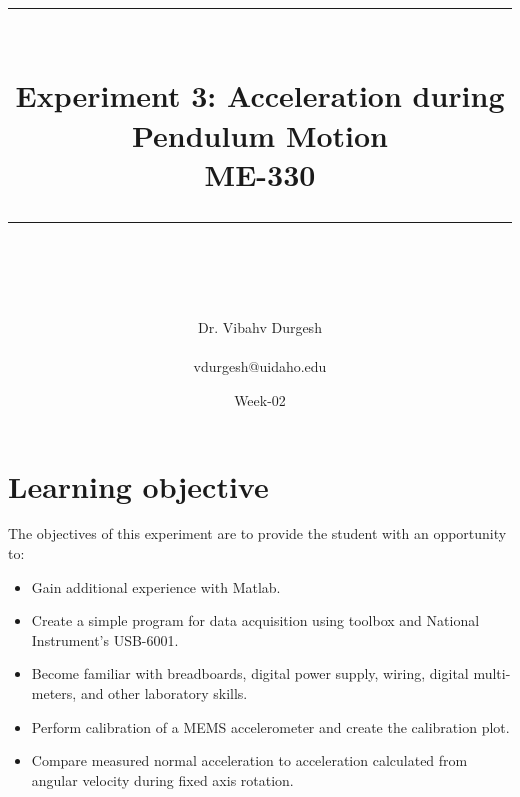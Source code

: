 \documentclass{article} %
\newcommand{\HRule}{\rule{\linewidth}{0.5mm}} %
\begin{document}


\title{
\begin{center}
\HRule \\[0.4cm]
{\Huge \bfseries Experiment 3: Acceleration during Pendulum Motion \\[0.5cm] \Large ME-330}\\[0.4cm] %
\HRule \\[1.5cm]
\end{center}
}
\author{\Huge Dr. Vibahv Durgesh \\ \\ \LARGE vdurgesh@uidaho.edu \\[2cm]} %
\date{Week-02} %
\maketitle

\tableofcontents

\clearpage



\section{Learning objective}
The objectives of this experiment are to provide the student with an opportunity to:

\begin{itemize}
\item Gain additional experience with Matlab.
\item Create a simple program for data acquisition using toolbox and National Instrument’s USB-6001.
\item Become familiar with breadboards, digital power supply, wiring, digital multi-meters, and other
laboratory skills.
\item Perform calibration of a MEMS accelerometer and create the calibration plot.
\item Compare measured normal acceleration to acceleration calculated from angular velocity during
fixed axis rotation.
\end{itemize}
\end{document}
